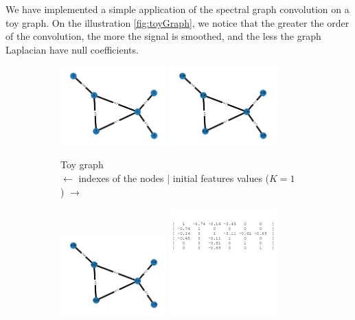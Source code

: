We have implemented a simple application of the spectral graph convolution on a toy graph. 
On the illustration \ref{fig:toyGraph}, we notice that the greater the order of the convolution,  the more the signal is smoothed, and the less the graph Laplacian have null coefficients.

 \begin{figure}
    \centering
    \begin{subfigure}{0.45\textwidth}
        \centering
        \includegraphics[width=0.45\textwidth]{figures/toy_graph_init.png}
        \includegraphics[width=0.45\textwidth]{figures/toy_graph_conv_K1.png}
        \caption{Toy graph\\ $\leftarrow$ indexes of the nodes | initial features values ($K=1$) $\rightarrow$}
    \end{subfigure}
    \hfill
    \begin{subfigure}{0.45\textwidth}
        \centering
        \includegraphics[width=0.45\textwidth]{figures/toy_graph_conv_K2.png}
        \includegraphics[width=0.45\textwidth]{figures/lap1.png}

\end{subfigure}
\end{figure}
